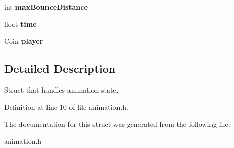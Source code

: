 \begin{DoxyCompactItemize}
\item 
\hypertarget{struct_animation_a881ac177b0e6feeb173f2ab6c1ae2667}{int {\bfseries max\-Bounce\-Distance}}\label{struct_animation_a881ac177b0e6feeb173f2ab6c1ae2667}

\item 
\hypertarget{struct_animation_ad8d4d4bba5b9accfba17cc9ecf5f3b50}{float {\bfseries time}}\label{struct_animation_ad8d4d4bba5b9accfba17cc9ecf5f3b50}

\item 
\hypertarget{struct_animation_a4d5850dde030ebc98d8f7a4427390ee4}{Coin {\bfseries player}}\label{struct_animation_a4d5850dde030ebc98d8f7a4427390ee4}

\end{DoxyCompactItemize}


\subsection{Detailed Description}
Struct that handles animation state. 

Definition at line 10 of file animation.\-h.



The documentation for this struct was generated from the following file\-:\begin{DoxyCompactItemize}
\item 
animation.\-h\end{DoxyCompactItemize}
